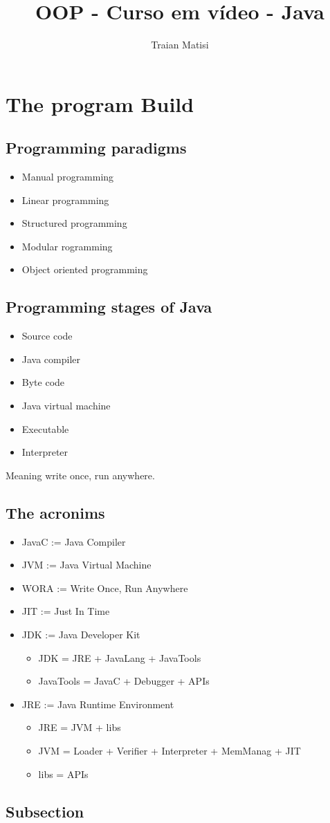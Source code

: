 \documentclass[a4paper, 12pt]{article}
\title{OOP - Curso em vídeo - Java}
\author{Traian Matisi}
\begin{document}
	\maketitle
	\section{The program Build}
	\subsection{Programming paradigms}
	\begin{itemize}
		\item Manual programming
		\item Linear programming
		\item Structured programming
		\item Modular rogramming
		\item Object oriented programming
	\end{itemize}
	\subsection{Programming stages of Java}
	\begin{itemize}
		\item Source code
		\item Java compiler
		\item Byte code
		\item Java virtual machine
		\item Executable
		\item Interpreter
	\end{itemize}
	Meaning write once, run anywhere.
	\subsection{The acronims}
	\begin{itemize}
		\item JavaC := Java Compiler
		\item JVM := Java Virtual Machine
		\item WORA := Write Once, Run Anywhere
		\item JIT := Just In Time
		\item JDK := Java Developer Kit
			\begin{itemize}
				\item JDK = JRE + JavaLang + JavaTools
				\item JavaTools = JavaC + Debugger + APIs
			\end{itemize}
		\item JRE := Java Runtime Environment
			\begin{itemize}
				\item JRE = JVM + libs
				\item JVM = Loader + Verifier + Interpreter + MemManag + JIT
				\item libs = APIs
			\end{itemize}
	\end{itemize}
	\subsection{Subsection}
\end{document}
